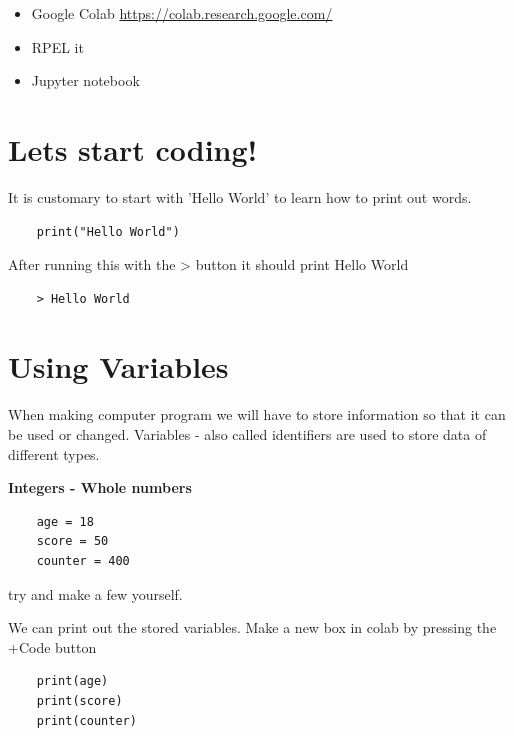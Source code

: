 \documentclass[12pt,a4paper, blue]{bbe}
\begin{document}
	
	\begin{link}[]
    	\begin{itemize}[c]     %
    	    \item Google Colab   \url{https://colab.research.google.com/}
    	    \item RPEL it
    	    \item Jupyter notebook
	    \end{itemize}
	
	\end{link}
	
	
	\section{Lets start coding!}
	
	It is customary to start with 'Hello World' to learn how to print out words.
	

	\begin{lstlisting}
    print("Hello World")\end{lstlisting}
	
    After running this with the > button it should print Hello World
    
    \begin{lstlisting}
    > Hello World\end{lstlisting}
    
    
    
    \section{Using Variables}
    
    When making computer program we will have to store information so that it can be used or changed.
    Variables - also called identifiers are used to store data of different types.
    
    \vspace{5mm}
    \textbf{Integers - Whole numbers}
    
    \begin{lstlisting}
    age = 18
    score = 50
    counter = 400\end{lstlisting}
    
    try and make a few yourself.
    
    We can print out the stored variables. Make a new box in colab by pressing the +Code button
    
    \begin{lstlisting}
    print(age)
    print(score)
    print(counter)\end{lstlisting}
    
\end{document}
